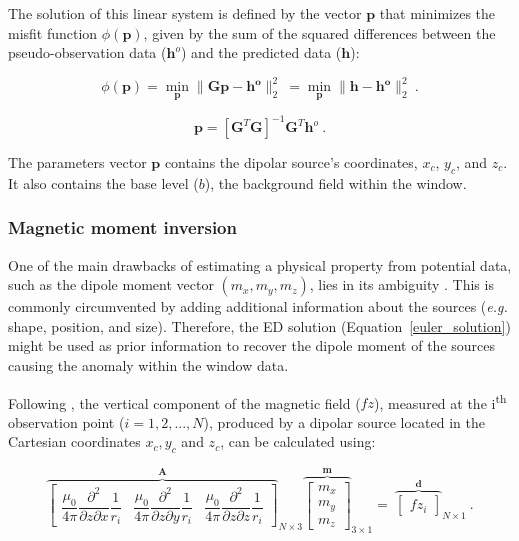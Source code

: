     The solution of this linear system is defined by the vector $\mathbf{p}$ that minimizes the misfit function $\phi(\mathbf{p})$, given by the sum of the squared differences between the pseudo-observation data ($\mathbf{h}^o$) and the predicted data ($\mathbf{h}$):
    
    \begin{equation}
    \label{function_phi}
    \phi(\mathbf{p}) = \min_{\mathbf{p}} \| \mathbf{G}\mathbf{p} - \mathbf{\mathbf{h}^o} \|_2^2\ = \min_{\mathbf{p}} \| \mathbf{h} - \mathbf{\mathbf{h}^o} \|_2^2\
    .
    \end{equation}
    
    
    \begin{equation}
    \label{euler_solution}
    \mathbf{p} = {[\mathbf{G}^T \mathbf{G}]}^{-1} \mathbf{G}^T \mathbf{h}^o\ .
    \end{equation}
    
    The parameters vector $\mathbf{p}$ contains the dipolar source's coordinates, $x_c$, $y_c$, and $z_c$. It also contains the base level ($b$), the background field within the window.
    
\subsubsection{Magnetic moment inversion} 
    One of the main drawbacks of estimating a physical property from potential data, such as the dipole moment vector $(m_x, m_y, m_z)$, lies in its ambiguity \citep{Blakely1996}. This is commonly circumvented by adding additional information about the sources (\textit{e.g.} shape, position, and size). Therefore, the ED solution (Equation~\ref{euler_solution}) might be used as prior information to recover the dipole moment of the sources causing the anomaly within the window data.
    
     Following \citet{Oliveira2015Estimation}, the vertical component of the magnetic field ($fz$), measured at the i\textsuperscript{th} observation point ($i=1, 2, ..., N$), produced by a dipolar source located in the Cartesian coordinates $x_c, y_c$ and $z_c$, can be calculated using:

     \begin{equation}
    \label{eq_dipole_bz}
    {\overbrace{\begin{bmatrix}
    \dfrac{\mu_0}{4\pi} \dfrac{\partial^2}{\partial z \partial x} \dfrac{1}{r_i}
    & \dfrac{\mu_0}{4\pi} \dfrac{\partial^2}{\partial z \partial y} \dfrac{1}{r_i}
    & \dfrac{\mu_0}{4\pi} \dfrac{\partial^2}{\partial z \partial z} \dfrac{1}{r_i}
    \end{bmatrix}}^{\mathbf{A}}}_{N \times 3}
    {\overbrace{{\begin{bmatrix}
    m_x \\ m_y \\ m_z
    \end{bmatrix}}}^{\mathbf{m}}}_{3 \times 1}
    =
    ~{\overbrace{\begin{bmatrix}
    fz_i
    \end{bmatrix}}^{\mathbf{d}}}_{N \times 1}
    \ .
    \end{equation}

